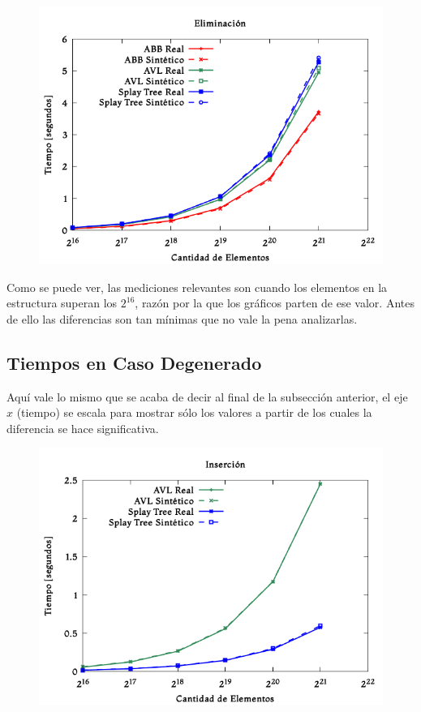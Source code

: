 \documentclass[12pt,letterpaper]{report}
\begin{document}
\begin{figure}[H]
\begin{center}
\includegraphics[scale=0.65]{random_eliminacion.png}
\end{center}
\end{figure}

Como se puede ver, las mediciones relevantes son cuando los elementos en la estructura superan los $2^{16}$, razón por la que los gráficos parten de ese valor. Antes de ello las diferencias son tan mínimas que no vale la pena analizarlas.

\subsection{Tiempos en Caso Degenerado}
\label{subsec:res_degenerado}

Aquí vale lo mismo que se acaba de decir al final de la subsección anterior, el eje $x$ (tiempo) se escala para mostrar sólo los valores a partir de los cuales la diferencia se hace significativa.

\begin{figure}[H]
\begin{center}
\includegraphics[scale=0.65]{degenerado_insercion.png}
\end{center}
\end{figure}
\end{document}

